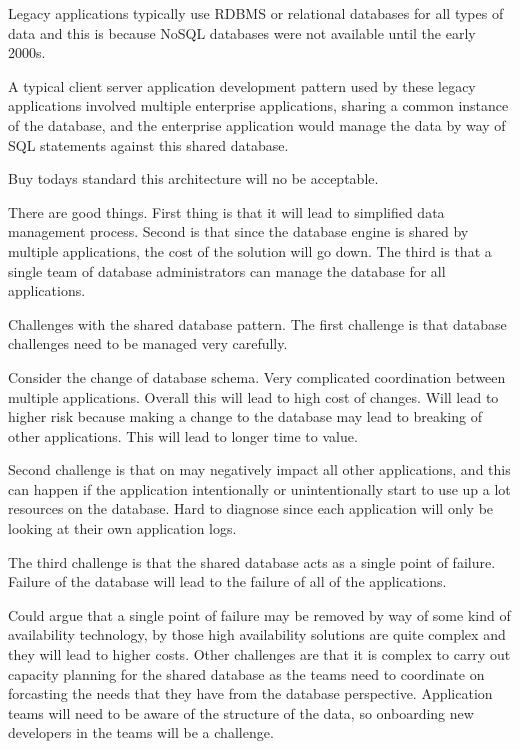 \documentclass[a4paper, 11pt]{book}
\begin{document}
    Legacy applications typically use RDBMS or relational databases for all types of data and this is because NoSQL databases were not available until the early 2000s.

    A typical client server application development pattern used by these legacy applications involved multiple enterprise applications, sharing a common instance of the database,
    and the enterprise application would manage the data by way of SQL statements against this shared database.

    Buy todays standard this architecture will no be acceptable.

    There are good things.
    First thing is that it will lead to simplified data management process.
    Second is that since the database engine is shared by multiple applications, the cost of the solution will go down.
    The third is that a single team of database administrators can manage the database for all applications.

    Challenges with the shared database pattern.
    The first challenge is that database challenges need to be managed very carefully.

    Consider the change of database schema.
    Very complicated coordination between multiple applications.
    Overall this will lead to high cost of changes.
    Will lead to higher risk because making a change to the database may lead to breaking of other applications.
    This will lead to longer time to value.

    Second challenge is that on may negatively impact all other applications, and this can happen if the application intentionally or unintentionally start to use up a lot resources on the database.
    Hard to diagnose since each application will only be looking at their own application logs.

    The third challenge is that the shared database acts as a single point of failure.
    Failure of the database will lead to the failure of all of the applications.

    Could argue that a single point of failure may be removed by way of some kind of availability technology, by those high availability solutions are quite complex and they will lead to higher costs.
    Other challenges are that it is complex to carry out capacity planning for the shared database as the teams need to coordinate on forcasting the needs that they have from the database perspective.
    Application teams will need to be aware of the structure of the data, so onboarding new developers in the teams will be a challenge.
\end{document}
